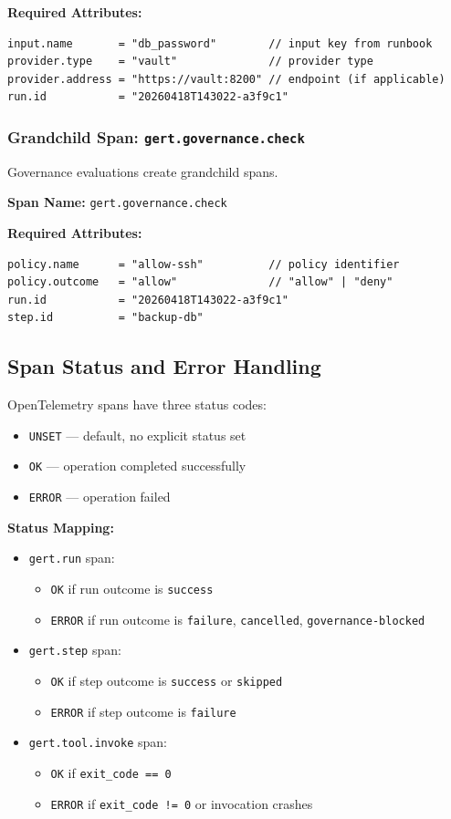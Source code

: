 \textbf{Required Attributes:}
\begin{verbatim}
input.name       = "db_password"        // input key from runbook
provider.type    = "vault"              // provider type
provider.address = "https://vault:8200" // endpoint (if applicable)
run.id           = "20260418T143022-a3f9c1"
\end{verbatim}

\subsubsection{Grandchild Span: \texttt{gert.governance.check}}

Governance evaluations create grandchild spans.

\textbf{Span Name:} \texttt{gert.governance.check}

\textbf{Required Attributes:}
\begin{verbatim}
policy.name      = "allow-ssh"          // policy identifier
policy.outcome   = "allow"              // "allow" | "deny"
run.id           = "20260418T143022-a3f9c1"
step.id          = "backup-db"
\end{verbatim}

\subsection{Span Status and Error Handling}

OpenTelemetry spans have three status codes:
\begin{itemize}
  \item \texttt{UNSET} — default, no explicit status set
  \item \texttt{OK} — operation completed successfully
  \item \texttt{ERROR} — operation failed
\end{itemize}

\textbf{Status Mapping:}
\begin{itemize}
  \item \texttt{gert.run} span:
    \begin{itemize}
      \item \texttt{OK} if run outcome is \texttt{success}
      \item \texttt{ERROR} if run outcome is \texttt{failure}, \texttt{cancelled}, \texttt{governance-blocked}
    \end{itemize}
  \item \texttt{gert.step} span:
    \begin{itemize}
      \item \texttt{OK} if step outcome is \texttt{success} or \texttt{skipped}
      \item \texttt{ERROR} if step outcome is \texttt{failure}
    \end{itemize}
  \item \texttt{gert.tool.invoke} span:
    \begin{itemize}
      \item \texttt{OK} if \texttt{exit\_code == 0}
      \item \texttt{ERROR} if \texttt{exit\_code != 0} or invocation crashes
    \end{itemize}
\end{itemize}

